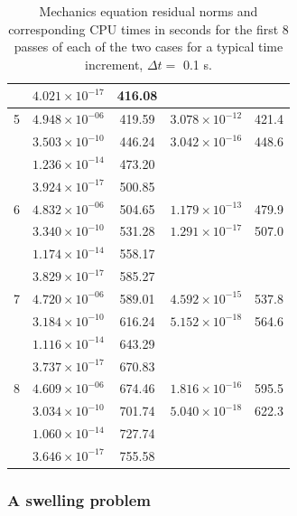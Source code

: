 \begin{table}
\begin{tabular}{|r|c|c|c|c|}
      & $ 4.021\times 10^{-17}$ &  416.08   & $                    $   &  \\
\hline                                    
5     & $ 4.948\times 10^{-06}$ &  419.59   & $3.078 \times 10^{-12}$  &  421.4 \\
      & $ 3.503\times 10^{-10}$ &  446.24   & $3.042 \times 10^{-16}$  &  448.6 \\
      & $ 1.236\times 10^{-14}$ &  473.20   & $                    $   &  \\
      & $ 3.924\times 10^{-17}$ &  500.85   & $                    $   &  \\
\hline                                    
6     & $ 4.832\times 10^{-06}$ &  504.65   & $1.179 \times 10^{-13}$  &  479.9 \\
      & $ 3.340\times 10^{-10}$ &  531.28   & $1.291 \times 10^{-17}$  &  507.0 \\
      & $ 1.174\times 10^{-14}$ &  558.17   & $                    $   &  \\
      & $ 3.829\times 10^{-17}$ &  585.27   & $                    $   &  \\
\hline                                    
7     & $ 4.720\times 10^{-06}$ &  589.01   & $4.592 \times 10^{-15}$  &  537.8 \\
      & $ 3.184\times 10^{-10}$ &  616.24   & $5.152 \times 10^{-18}$  &  564.6 \\
      & $ 1.116\times 10^{-14}$ &  643.29   & $                    $   &  \\
      & $ 3.737\times 10^{-17}$ &  670.83   & $                    $   &  \\
\hline                                    
8     & $ 4.609\times 10^{-06}$ &  674.46   & $1.816 \times 10^{-16}$  &  595.5  \\
      & $ 3.034\times 10^{-10}$ &  701.74   & $5.040 \times 10^{-18}$  &  622.3  \\
      & $ 1.060\times 10^{-14}$ &  727.74   & $                    $   &  \\
      & $ 3.646\times 10^{-17}$ &  755.58   & $                    $   &  \\
\hline
\end{tabular}
\caption{Mechanics equation residual norms and corresponding CPU times
  in seconds for the first 8 passes of each of the two cases for a
  typical time increment, $\Delta t=$ 0.1 s.}
\label{resnorms}
\end{table}

\subsubsection{A swelling problem}
\label{swelling}

